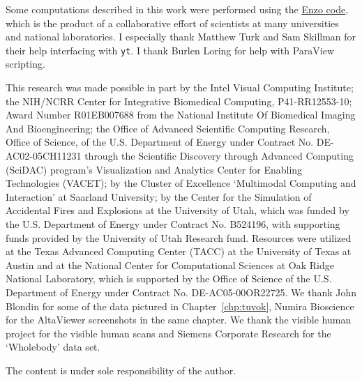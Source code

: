 Some computations described in this work were performed using the
\href{http://enzo-project.org}{Enzo code}, which is the product of a
collaborative effort of scientists at many universities and national
laboratories.  I especially thank Matthew Turk and Sam Skillman for
their help interfacing with \texttt{yt}.  I thank Burlen Loring for
help with ParaView scripting.

This research was made possible in part by the Intel Visual
Computing Institute; the NIH/NCRR Center for Integrative Biomedical
Computing, P41-RR12553-10; Award Number R01EB007688 from the National
Institute Of Biomedical Imaging And Bioengineering; the Office of
Advanced Scientific Computing Research, Office of Science, of the
U.S. Department of Energy under Contract No. DE-AC02-05CH11231
through the Scientific Discovery through Advanced Computing (SciDAC)
program's Visualization and Analytics Center for Enabling Technologies
(VACET); by the Cluster of Excellence `Multimodal Computing and
Interaction' at Saarland University; by the Center for the Simulation
of Accidental Fires and Explosions at the University of Utah, which was
funded by the U.S. Department of Energy under Contract No. B524196,
with supporting funds provided by the University of Utah Research
fund. Resources were utilized at the Texas Advanced Computing Center
(TACC) at the University of Texas at Austin and at the National Center
for Computational Sciences at Oak Ridge National Laboratory, which is
supported by the Office of Science of the U.S. Department of Energy
under Contract No. DE-AC05-00OR22725.  We thank John Blondin for some
of the
data pictured in Chapter~\ref{chp:tuvok}, Numira Bioscience for the
AltaViewer screenshots in the same chapter.  We thank the visible human
project for the visible human scans and Siemens Corporate Research for
the `Wholebody' data set.

The content is under sole responsibility of the author.

